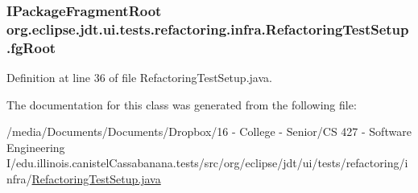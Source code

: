 \hypertarget{classorg_1_1eclipse_1_1jdt_1_1ui_1_1tests_1_1refactoring_1_1infra_1_1RefactoringTestSetup_a975714f4eccc9bd2a51353ef9ecab496}{
\subsubsection[{fgRoot}]{\setlength{\rightskip}{0pt plus 5cm}IPackageFragmentRoot {\bf org.eclipse.jdt.ui.tests.refactoring.infra.RefactoringTestSetup.fgRoot}}}
\label{classorg_1_1eclipse_1_1jdt_1_1ui_1_1tests_1_1refactoring_1_1infra_1_1RefactoringTestSetup_a975714f4eccc9bd2a51353ef9ecab496}


Definition at line 36 of file RefactoringTestSetup.java.



The documentation for this class was generated from the following file:\begin{DoxyCompactItemize}
\item 
/media/Documents/Documents/Dropbox/16 -\/ College -\/ Senior/CS 427 -\/ Software Engineering I/edu.illinois.canistelCassabanana.tests/src/org/eclipse/jdt/ui/tests/refactoring/infra/\hyperlink{RefactoringTestSetup_8java}{RefactoringTestSetup.java}\end{DoxyCompactItemize}
